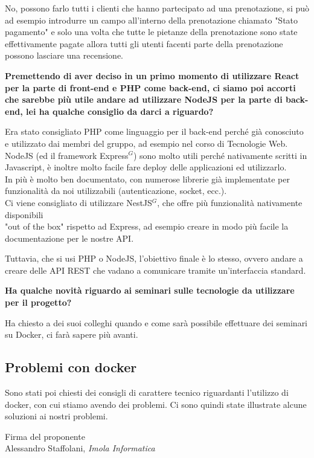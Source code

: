 \documentclass[a4paper, 11pt]{article}
\begin{document}
No, possono farlo tutti i clienti che hanno partecipato ad una prenotazione, si può ad esempio introdurre un campo all'interno della prenotazione chiamato "Stato pagamento" 
e solo una volta che tutte le pietanze della prenotazione sono state effettivamente pagate allora tutti gli utenti facenti parte della prenotazione possono lasciare una recensione. \\ \newline


\textbf{Premettendo di aver deciso in un primo momento di utilizzare React per la parte di front-end e PHP come back-end, ci siamo poi accorti che sarebbe più utile andare ad utilizzare NodeJS per la parte di back-end, lei ha qualche consiglio da darci a riguardo?}

Era stato consigliato PHP come linguaggio per il back-end perché già conosciuto e utilizzato dai membri del gruppo, ad esempio nel corso di Tecnologie Web. \\
NodeJS (ed il framework Express$^{G}$) sono molto utili perché nativamente scritti in Javascript, è inoltre molto facile fare deploy delle applicazioni ed utilizzarlo. \\
In più è molto ben documentato, con numerose librerie già implementate per funzionalità da noi utilizzabili (autenticazione, socket, ecc.). \\
Ci viene consigliato di utilizzare NestJS$^{G}$, che offre più funzionalità nativamente disponibili \\ "out of the box" rispetto ad Express, ad esempio creare in modo più facile la documentazione per le nostre API.

Tuttavia, che si usi PHP o NodeJS, l'obiettivo finale è lo stesso, ovvero andare a creare delle API REST che vadano a comunicare tramite un'interfaccia standard.\\ \newline

\textbf{Ha qualche novità riguardo ai seminari sulle tecnologie da utilizzare per il progetto?}

Ha chiesto a dei suoi colleghi quando e come sarà possibile effettuare dei seminari su Docker, ci farà sapere più avanti. \\ \newline

\subsection{Problemi con docker}

Sono stati poi chiesti dei consigli di carattere tecnico riguardanti l'utilizzo di docker, con cui stiamo avendo dei problemi.
Ci sono quindi state illustrate alcune soluzioni ai nostri problemi.

\vspace{40pt}
\begin{flushleft}
\hfill Firma del proponente \\
\vspace{50pt}
\hfill Alessandro Staffolani, \textit{Imola Informatica}
\end{flushleft}
\end{document}
